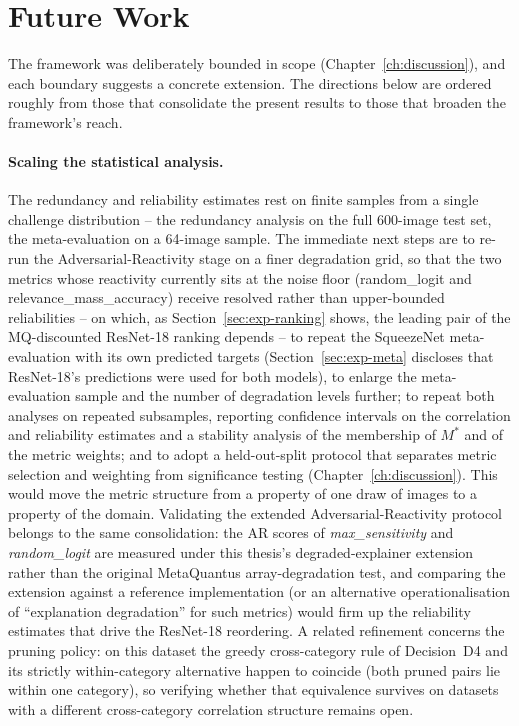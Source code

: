 \section{Future Work}
\label{sec:concl-future}

The framework was deliberately bounded in scope (Chapter~\ref{ch:discussion}),
and each boundary suggests a concrete extension. The directions below are
ordered roughly from those that consolidate the present results to those that
broaden the framework's reach.

\paragraph{Scaling the statistical analysis.}
The redundancy and reliability estimates rest on finite samples from a single
challenge distribution -- the redundancy analysis on the full 600-image test
set, the meta-evaluation on a 64-image sample. The immediate next steps are
to re-run the Adversarial-Reactivity stage on a finer degradation grid, so
that the two metrics whose reactivity currently sits at the noise floor
(random\_logit and relevance\_mass\_accuracy) receive resolved rather than
upper-bounded reliabilities -- on which, as
Section~\ref{sec:exp-ranking} shows, the leading pair of the
MQ-discounted ResNet-18 ranking depends -- to repeat the SqueezeNet
meta-evaluation with its own predicted targets
(Section~\ref{sec:exp-meta} discloses that ResNet-18's predictions were
used for both models), to enlarge the meta-evaluation
sample and the number of degradation levels further; to
repeat both analyses on repeated
subsamples, reporting confidence intervals on the correlation and reliability
estimates and a stability analysis of the membership of $M^{*}$ and of the
metric weights; and to adopt a held-out-split protocol that separates
metric selection and weighting from significance testing
(Chapter~\ref{ch:discussion}). This would move the metric structure from a
property of one
draw of images to a property of the domain. Validating the extended
Adversarial-Reactivity protocol belongs to the same consolidation: the AR
scores of \emph{max\_sensitivity} and \emph{random\_logit} are measured under
this thesis's degraded-explainer extension rather than the original
MetaQuantus array-degradation test, and comparing the extension against a
reference implementation (or an alternative operationalisation of
``explanation degradation'' for such metrics) would firm up the reliability
estimates that drive the ResNet-18 reordering. A related refinement concerns
the pruning policy: on this
dataset the greedy cross-category rule of Decision~D4 and its strictly
within-category alternative happen to coincide (both pruned pairs lie within
one category), so verifying whether that equivalence survives on datasets with
a different cross-category correlation structure remains open.

